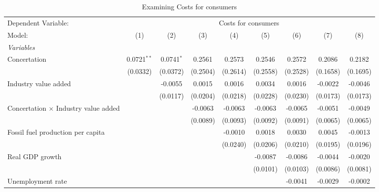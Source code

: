 
\begin{table}[htbp]
   \caption{Examining Costs for consumers}
   \centering
   \begin{tabular}{lcccccccc}
      \tabularnewline \midrule \midrule
      Dependent Variable: & \multicolumn{8}{c}{Costs for consumers}\\
      Model:                                      & (1)           & (2)          & (3)      & (4)      & (5)      & (6)      & (7)      & (8)\\  
      \midrule
      \emph{Variables}\\
      Concertation                                & 0.0721$^{**}$ & 0.0741$^{*}$ & 0.2561   & 0.2573   & 0.2546   & 0.2572   & 0.2086   & 0.2182\\   
                                                  & (0.0332)      & (0.0372)     & (0.2504) & (0.2614) & (0.2558) & (0.2528) & (0.1658) & (0.1695)\\   
      Industry value added                        &               & -0.0055      & 0.0015   & 0.0016   & 0.0034   & 0.0016   & -0.0022  & -0.0046\\   
                                                  &               & (0.0117)     & (0.0204) & (0.0218) & (0.0228) & (0.0230) & (0.0173) & (0.0173)\\   
      Concertation $\times$ Industry value added  &               &              & -0.0063  & -0.0063  & -0.0063  & -0.0065  & -0.0051  & -0.0049\\   
                                                  &               &              & (0.0089) & (0.0093) & (0.0092) & (0.0091) & (0.0065) & (0.0065)\\   
      Fossil fuel production per capita           &               &              &          & -0.0010  & 0.0018   & 0.0030   & 0.0045   & -0.0013\\   
                                                  &               &              &          & (0.0240) & (0.0206) & (0.0210) & (0.0195) & (0.0196)\\   
      Real GDP growth                             &               &              &          &          & -0.0087  & -0.0086  & -0.0044  & -0.0020\\   
                                                  &               &              &          &          & (0.0101) & (0.0103) & (0.0086) & (0.0081)\\   
      Unemployment rate                           &               &              &          &          &          & -0.0041  & -0.0029  & -0.0002\\   

\end{tabular}
\end{table}
